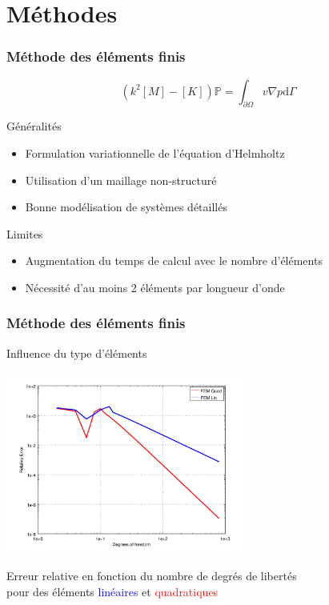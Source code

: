 \documentclass[10pt, compress]{beamer}
\newcommand\GP{\mathbb{P}}
\begin{document}
\section{Méthodes}

\begin{frame}
	\frametitle{Méthode des éléments finis}

	$$\left(k^2[M] - [K]\right)\GP = \int_{\partial\Omega} v\nabla p\mathrm{d}\Gamma$$

	\begin{block}{Généralités}
		\begin{itemize}
			\item Formulation variationnelle de l'équation d'Helmholtz
			\item Utilisation d'un maillage non-structuré
			\item Bonne modélisation de systèmes détaillés
		\end{itemize}
	\end{block}
	\pause
	\begin{block}{Limites}
		\begin{itemize}
			\item Augmentation du temps de calcul avec le nombre d'éléments
			\item Nécessité d'au moins 2 éléments par longueur d'onde
		\end{itemize}
	\end{block}
\end{frame}

\begin{frame}
	\frametitle{Méthode des éléments finis}

	\begin{block}{Influence du type d'éléments}
		\begin{center}
		\includegraphics[width=0.6\textwidth]{../report/part1/figs/FEM/simuls_1D/convergence.png}

        \footnotesize{Erreur relative en fonction du nombre de degrés de libertés\\
        pour des éléments \textcolor{blue}{linéaires} et \textcolor{red}{quadratiques}}
		\end{center}
	\end{block}
\end{frame}
\end{document}

